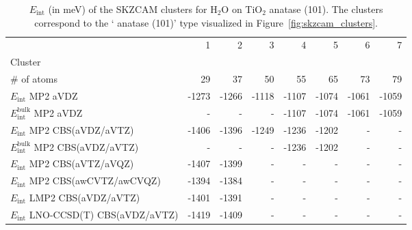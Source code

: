 \begin{table}
\caption{\label{tab:system_eint_a-tio2_h2o}$E_\textrm{int}$ (in meV) of the SKZCAM clusters for H$_2$O on TiO$_2$ anatase (101). The clusters correspond to the ` anatase (101)' type visualized in Figure~\ref{fig:skzcam_clusters}.}
\begin{adjustbox}{center,max width=1.4\textwidth}
\begin{tabular}{lrrrrrrr}
\toprule
 & 1 & 2 & 3 & 4 & 5 & 6 & 7 \\ 
Cluster &  &  &  &  &  &  &  \\
\midrule
\# of atoms & 29 & 37 & 50 & 55 & 65 & 73 & 79 \\
$E_\textrm{int}$ MP2 aVDZ & -1273 & -1266 & -1118 & -1107 & -1074 & -1061 & -1059 \\
$E_\textrm{int}^\textrm{bulk}$ MP2 aVDZ & - & - & - & -1107 & -1074 & -1061 & -1059 \\
$E_\textrm{int}$ MP2 CBS(aVDZ/aVTZ) & -1406 & -1396 & -1249 & -1236 & -1202 & - & - \\
$E_\textrm{int}^\textrm{bulk}$ MP2 CBS(aVDZ/aVTZ) & - & - & - & -1236 & -1202 & - & - \\
$E_\textrm{int}$ MP2 CBS(aVTZ/aVQZ) & -1407 & -1399 & - & - & - & - & - \\
$E_\textrm{int}$ MP2 CBS(awCVTZ/awCVQZ) & -1394 & -1384 & - & - & - & - & - \\
$E_\textrm{int}$ LMP2 CBS(aVDZ/aVTZ) & -1401 & -1391 & - & - & - & - & - \\
$E_\textrm{int}$ LNO-CCSD(T) CBS(aVDZ/aVTZ) & -1419 & -1409 & - & - & - & - & - \\
\bottomrule
\end{tabular}
\end{adjustbox}
\end{table}

